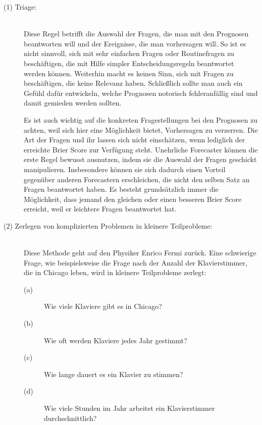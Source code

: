 \begin{description}

\item[(1) Triage:] \hfill \\
Diese Regel betrifft die Auswahl der Fragen, die man mit den Prognosen beantworten will und
der Ereignisse, die man vorhersagen will. So ist es nicht sinnvoll, sich mit sehr einfachen Fragen
oder Routinefragen zu beschäftigen, die mit Hilfe simpler Entscheidungsregeln beantwortet werden können.
Weiterhin macht es keinen Sinn, sich mit Fragen zu beschäftigen, die keine Relevanz haben. Schließlich
sollte man auch ein Gefühl dafür entwickeln, welche Prognosen notorisch fehleranfällig sind und damit
gemieden werden sollten.

Es ist auch wichtig auf die konkreten Fragestellungen bei den Prognosen zu achten, weil sich hier
eine Möglichkeit bietet, Vorhersagen zu verzerren. Die Art der Fragen und ihr \grqq{}
lassen sich nicht einschätzen, wenn lediglich der erreichte Brier Score zur Verfügung steht.
Unehrliche Forecaster können die erste Regel bewusst ausnutzen, indem sie die Auswahl der Fragen geschickt
manipulieren. Insbesondere können sie sich dadurch einen Vorteil gegenüber anderen Forecastern erschleichen,
die nicht den selben Satz an Fragen beantwortet haben. Es besteht grundsätzlich immer die Möglichkeit, dass
jemand den gleichen oder einen besseren Brier Score erreicht, weil er leichtere Fragen beantwortet hat.

\item[(2) Zerlegen von komplizierten Problemen in kleinere Teilprobleme:] \hfill \\
Diese Methode geht auf den Physiker Enrico Fermi zurück. Eine schwierige Frage, wie beispielsweise die
Frage nach der Anzahl der Klavierstimmer, die in Chicago leben, wird in kleinere Teilprobleme zerlegt:

\begin{description}

\item[(a)] Wie viele Klaviere gibt es in Chicago?
\item[(b)] Wie oft werden Klaviere jedes Jahr gestimmt?
\item[(c)] Wie lange dauert es ein Klavier zu stimmen?
\item[(d)] Wie viele Stunden im Jahr arbeitet ein Klavierstimmer durchschnittlich? 

\end{description}

\end{description}